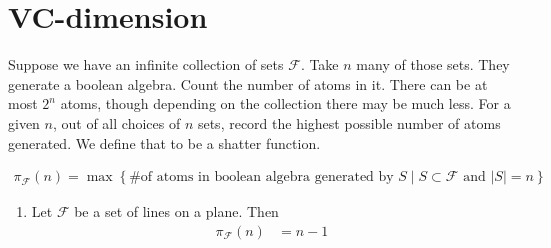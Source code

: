 \documentclass{amsart}
\newcommand{\F}{\mathcal F}
\newcommand{\curly}[1]{\left\{ #1 \right\}}
\begin{document}
\section{VC-dimension}

Suppose we have an infinite collection of sets $\F$.
Take $n$ many of those sets.
They generate a boolean algebra.
Count the number of atoms in it.
There can be at most $2^n$ atoms, though depending on the collection there may be much less.
For a given $n$, out of all choices of $n$ sets, record the highest possible number of atoms generated.
We define that to be a shatter function.

\begin{Definition}
	\begin{align*}
		\pi_\F(n) = \max \curly{ \text {\# of atoms in boolean algebra generated by $S$} \mid S \subset \F \text{ and } |S| = n}
	\end{align*}
\end{Definition}

\begin{Example}
	\begin{enumerate}
		\item Let $\F$ be a set of lines on a plane. Then
		\begin{align*}
			\pi_\F(n) &= n - 1
		\end{align*}
	\end{enumerate}
\end{Example}
\end{document}
